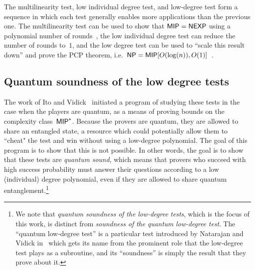 The multilinearity test, low individual degree test, and low-degree test
form a sequence
in which each test generally enables more applications than the previous one.
The multilinearity test can be used to show that $\mathsf{MIP} = \mathsf{NEXP}$ using a polynomial number of rounds~\cite{BFL91},
the low individual degree test can reduce the number of rounds to~$1$,
and the low degree test can be used to ``scale this result down''
and prove the PCP theorem, i.e.\ $\mathsf{NP} = \mathsf{MIP}[O(\log(n)), O(1)]$~\cite{AS98,ALM+98}.

\subsection{Quantum soundness of the low degree tests}

The work of Ito and Vidick~\cite{IV12}
initiated a program of studying these tests
in the case when the players are quantum,
as a means of proving bounds on the complexity class~$\mathsf{MIP}^*$.
Because the provers are quantum, 
they are allowed to share an entangled state,
a resource which could potentially allow them to ``cheat" the test
and win without using a low-degree polynomial.
The goal of this program is to show that this is not possible.
In other words, the goal is to show that these tests are \emph{quantum sound},
which means that provers who succeed with high success probability
must answer their questions according to a low (individual) degree polynomial,
even if they are allowed to share quantum entanglement.\footnote{We note that \emph{quantum soundness of the low-degree tests}, which is the focus of this work,
is distinct from \emph{soundness of the quantum low-degree test}.
The ``quantum low-degree test'' is a particular test introduced by Natarajan and Vidick in~\cite{NV18a}
which gets its name from the prominent role that the low-degree test plays as a subroutine,
and its ``soundness'' is simply the result that they prove about it.
}

